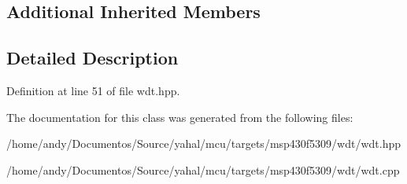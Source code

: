 \subsection*{Additional Inherited Members}


\subsection{Detailed Description}
\begin{DoxyVerb}\end{DoxyVerb}
 

Definition at line 51 of file wdt.\+hpp.



The documentation for this class was generated from the following files\+:\begin{DoxyCompactItemize}
\item 
/home/andy/\+Documentos/\+Source/yahal/mcu/targets/msp430f5309/wdt/wdt.\+hpp\item 
/home/andy/\+Documentos/\+Source/yahal/mcu/targets/msp430f5309/wdt/wdt.\+cpp\end{DoxyCompactItemize}
